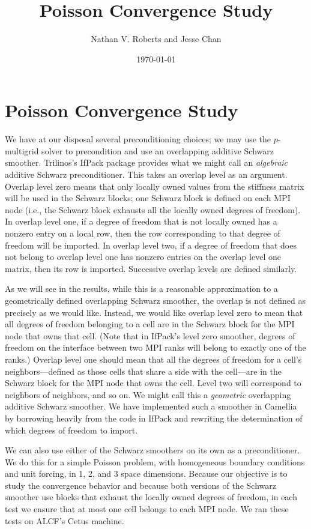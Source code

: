 \documentclass[11pt]{amsart}
\title{Poisson Convergence Study}
\author{Nathan V. Roberts and Jesse Chan}
\date{\today}
\begin{document}
\maketitle

\section{Poisson Convergence Study}
We have at our disposal several preconditioning choices; we may use the $p$-multigrid solver to precondition and use an overlapping additive Schwarz smoother.   Trilinos's IfPack package provides what we might call an \emph{algebraic} additive Schwarz preconditioner.  This takes an overlap level as an argument.  Overlap level zero means that only locally owned values from the stiffness matrix will be used in the Schwarz blocks; one Schwarz block is defined on each MPI node (i.e., the Schwarz block exhausts all the locally owned degrees of freedom).  In overlap level one, if a degree of freedom that is not locally owned has a nonzero entry on a local row, then the row corresponding to that degree of freedom will be imported.  In overlap level two, if a degree of freedom that does not belong to overlap level one has nonzero entries on the overlap level one matrix, then its row is imported.  Successive overlap levels are defined similarly.

As we will see in the results, while this is a reasonable approximation to a geometrically defined overlapping Schwarz smoother, the overlap is not defined as precisely as we would like.  Instead, we would like overlap level zero to mean that all degrees of freedom belonging to a cell are in the Schwarz block for the MPI node that owns that cell.  (Note that in IfPack's level zero smoother, degrees of freedom on the interface between two MPI ranks will belong to exactly one of the ranks.)  Overlap level one should mean that all the degrees of freedom for a cell's neighbors---defined as those cells that share a side with the cell---are in the Schwarz block for the MPI node that owns the cell.  Level two will correspond to neighbors of neighbors, and so on.  We might call this a \emph{geometric} overlapping additive Schwarz smoother.  We have implemented such a smoother in Camellia by borrowing heavily from the code in IfPack and rewriting the determination of which degrees of freedom to import.

We can also use either of the Schwarz smoothers on its own as a preconditioner.  We do this for a simple Poisson problem, with homogeneous boundary conditions and unit forcing, in 1, 2, and 3 space dimensions.  Because our objective is to study the convergence behavior and because both versions of the Schwarz smoother use blocks that exhaust the locally owned degrees of freedom, in each test we ensure that at most one cell belongs to each MPI node.  We ran these tests on ALCF's Cetus machine.
\end{document}
